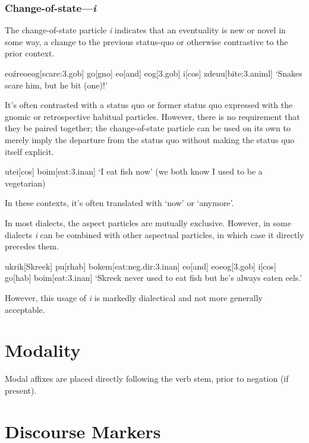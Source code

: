 \documentclass[a4paper,11pt,oneside,openany]{memoir}
\begin{document}
\subsubsection{Change-of-state---\textit{\vl i}}

The change-of-state particle \textit{\vl i} indicates that an eventuality is new or novel in some way, a change to the previous status-quo or otherwise contrastive to the prior context.

\ex
\begingl
\vS\vr eo\vd[snake]
\'zreo\vn\vz eog[scare:{\sc 3.gob}]
go[\sc gno]
eo[and]
eog[\sc 3.gob]
\vl i[\sc cos]
zdeu\vs u[bite:{\sc 3.animl}]
\glft `Snakes scare him, but he bit (one)!'
\endgl
\xe

It's often contrasted with a status quo or former status quo expressed with the gnomic or retrospective habitual particles. However, there is no requirement that they be paired together; the change-of-state particle can be used on its own to merely imply the departure from the status quo without making the status quo itself explicit.

\ex
\begingl
\Engma u\vz[fish]
te\vd[\sc 1]
\vl i[\sc cos]
bo\vs im[eat:{\sc 3.inan}]
\glft `I eat fish now' (we both know I used to be a vegetarian)
\endgl
\xe

In these contexts, it's often translated with `now' or `anymore'. 

In most dialects, the aspect particles are mutually exclusive. However, in some dialects \textit{\vl i} can be combined with other aspectual particles, in which case it directly precedes them.

\ex {}
\begingl
\Engma u\vz[fish]
\vS krik[Skreek]
pu[\sc rhab]
bo\vs kem[eat:{\sc neg.dir:3.inan}]
eo[and]
\vs\vr eo\vd[eel]
eog[\sc 3.gob]
\vl i[\sc cos]
go[\sc hab]
bo\vs im[eat:{\sc 3.inan}]
\glft `Skreek never used to eat fish but he's always eaten eels.'
\endgl
\xe

However, this usage of \textit{\vl i} is markedly dialectical and not more generally acceptable.

\section{Modality}

Modal affixes are placed directly following the verb stem, prior to negation (if present).

\section{Discourse Markers}
\end{document}
